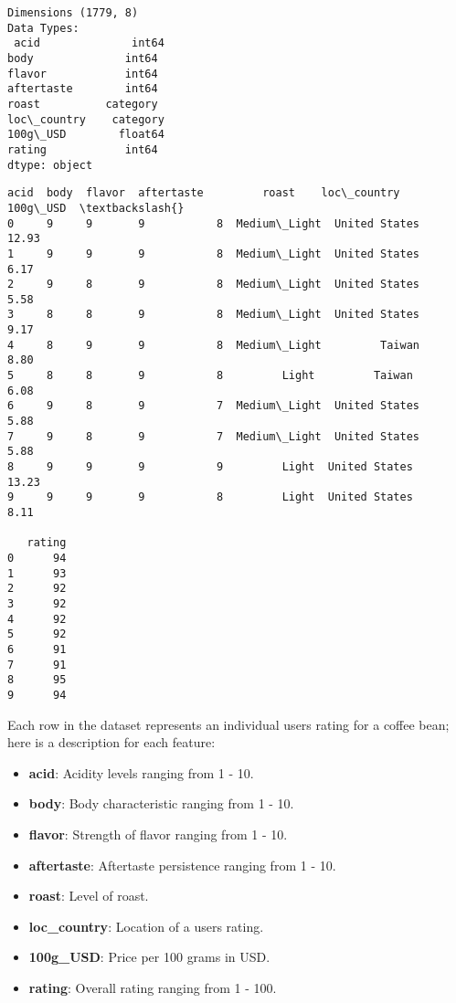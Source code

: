 \documentclass[11pt]{article}
\makeatletter
\providecommand{\tightlist}{%
      \setlength{\itemsep}{0pt}\setlength{\parskip}{0pt}}
\newcommand{\boxspacing}{\kern\kvtcb@left@rule\kern\kvtcb@boxsep}
\newcommand{\prompt}[4]{
        {\ttfamily\llap{{\color{#2}[#3]:\hspace{3pt}#4}}\vspace{-\baselineskip}}
    }
\makeatother
\begin{document}
    \begin{Verbatim}[commandchars=\\\{\}]
Dimensions (1779, 8)
Data Types:
 acid              int64
body              int64
flavor            int64
aftertaste        int64
roast          category
loc\_country    category
100g\_USD        float64
rating            int64
dtype: object
    \end{Verbatim}

            \begin{tcolorbox}[breakable, size=fbox, boxrule=.5pt, pad at break*=1mm, opacityfill=0]
\prompt{Out}{outcolor}{3}{\boxspacing}
\begin{Verbatim}[commandchars=\\\{\}]
   acid  body  flavor  aftertaste         roast    loc\_country  100g\_USD  \textbackslash{}
0     9     9       9           8  Medium\_Light  United States     12.93
1     9     9       9           8  Medium\_Light  United States      6.17
2     9     8       9           8  Medium\_Light  United States      5.58
3     8     8       9           8  Medium\_Light  United States      9.17
4     8     9       9           8  Medium\_Light         Taiwan      8.80
5     8     8       9           8         Light         Taiwan      6.08
6     9     8       9           7  Medium\_Light  United States      5.88
7     9     8       9           7  Medium\_Light  United States      5.88
8     9     9       9           9         Light  United States     13.23
9     9     9       9           8         Light  United States      8.11

   rating
0      94
1      93
2      92
3      92
4      92
5      92
6      91
7      91
8      95
9      94
\end{Verbatim}
\end{tcolorbox}
        
    Each row in the dataset represents an individual users rating for a
coffee bean; here is a description for each feature:

\begin{itemize}
\tightlist
\item
  \textbf{acid}: Acidity levels ranging from 1 - 10.
\item
  \textbf{body}: Body characteristic ranging from 1 - 10.
\item
  \textbf{flavor}: Strength of flavor ranging from 1 - 10.
\item
  \textbf{aftertaste}: Aftertaste persistence ranging from 1 - 10.
\item
  \textbf{roast}: Level of roast.
\item
  \textbf{loc\_country}: Location of a users rating.
\item
  \textbf{100g\_USD}: Price per 100 grams in USD.
\item
  \textbf{rating}: Overall rating ranging from 1 - 100.
\end{itemize}
\end{document}
